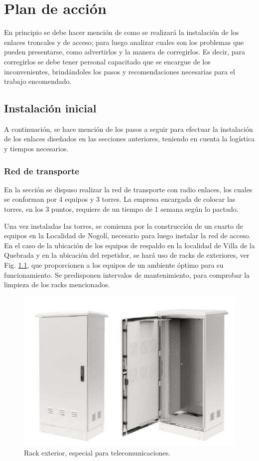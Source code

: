 \documentclass[12pt,a4paper]{book}
\begin{document}
\chapter{Plan de acción}\label{cap_plan_accion}

En principio se debe hacer mención de como se realizará la instalación de los enlaces troncales y de acceso; para luego analizar cuales son los problemas que pueden presentarse, como advertirlos y la manera de corregirlos. Es decir, para corregirlos se debe tener personal capacitado que se encargue de los inconvenientes, brindándoles los pasos y recomendaciones necesarias para el trabajo encomendado.


\section{Instalación inicial}

A continuación, se hace mención de los pasos a seguir para efectuar la instalación de los enlaces diseñados en las secciones anteriores, teniendo en cuenta la logística y tiempos necesarios.

\subsection{Red de transporte}
En la sección %
se dispuso realizar la red de transporte con radio enlaces, los cuales se conforman por 4 equipos y 3 torres. La empresa encargada de colocar las torres, en los 3 puntos, requiere de un tiempo de 1 semana según lo pactado.

\medskip

Una vez instaladas las torres, se comienza por la construcción de un cuarto de equipos en la Localidad de Nogolí, necesario para luego instalar la red de acceso. En el caso de la ubicación de los equipos de respaldo en la localidad de Villa de la Quebrada y en la ubicación del repetidor, se hará uso de racks de exteriores, ver Fig. \ref{fig_rack_ext_plan}, que proporcionen a los equipos de un ambiente óptimo para su funcionamiento. Se predisponen intervalos de mantenimiento, para comprobar la limpieza de los racks mencionados.

\begin{figure} [H]
\centering
\includegraphics[width= 8 cm]{../figuras/rack_exterior.jpg}
\caption{Rack exterior, especial para telecomunicaciones.}
\label{fig_rack_ext_plan}
\end{figure}
\end{document}
